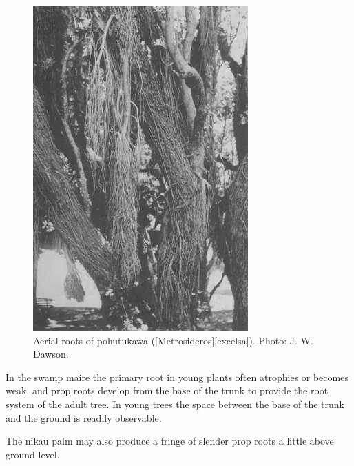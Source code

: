 \begin{figure}[htb]
\begin{minipage}[t]{0.302\textwidth}
    	\includegraphics[width=\textwidth]{graphics/figure15pohutakawa.jpg}
    	\caption[Aerial roots of pohutukawa]{Aerial roots of pohutukawa ([Metrosideros][excelsa]).
    	Photo:  J. W. Dawson.}%
    	\label{fig:15pohutakawa}
	\end{minipage}
\end{figure}

In the swamp maire the primary root in young plants often atrophies or becomes weak, and prop roots develop from the base of the trunk to provide the root system of the adult tree.
In young trees the space between the base of the trunk and the ground is readily observable.

The nikau palm may also produce a fringe of slender prop roots a little above ground level.


